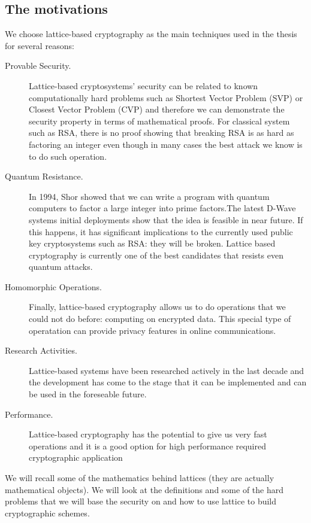 \subsection{The motivations}
\label{ssub:The motivations}
We choose lattice-based cryptography as the main techniques used in the
thesis for several reasons:
\begin{description}
\item[Provable Security.] Lattice-based cryptosystems' security can be related
  to known computationally hard problems such as Shortest Vector Problem (SVP)
  or Closest Vector Problem (CVP) and therefore we can demonstrate the security
  property in terms of mathematical proofs. For classical system such as RSA,
  there is no proof showing that breaking RSA is as hard as factoring an integer
  even though in many cases the best attack we know is to do such operation.
\item[Quantum Resistance.] In 1994, Shor \cite{shor1994algorithms} showed that
  we can write a program with quantum computers to factor a large integer
  into prime factors.The latest D-Wave systems initial deployments show that the
  idea is feasible in near future. If this happens, it has significant
  implications to the currently used public key cryptosystems such as RSA: they
  will be broken. Lattice based cryptography is currently one of the best
  candidates that resists even quantum attacks.
\item[Homomorphic Operations.] Finally, lattice-based cryptography allows us to
  do operations that we could not do before: computing on encrypted data. This
  special type of operatation can provide privacy features in online
  communications.
\item[Research Activities.] Lattice-based systems have been researched actively
  in the last decade and the development has come to the stage that it can be
  implemented and can be used in the foreseable future.
\item[Performance.] Lattice-based cryptography has the potential to give us very
  fast operations and it is a good option for high performance required
  cryptographic application
\end{description}
We will recall some of the mathematics behind lattices (they are actually
mathematical objects). We will look at the definitions and some of the hard
problems that we will base the security on and how to use lattice to build
cryptographic schemes.



